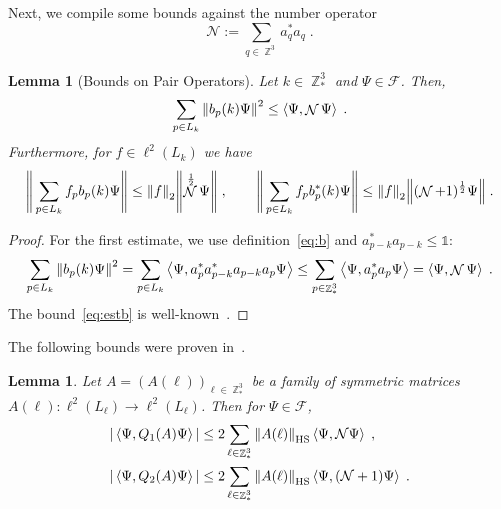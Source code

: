 \documentclass[12pt,a4paper]{article}
\numberwithin{equation}{section}
\newcommand{\cF}{\mathcal{F}}
\newcommand{\cN}{\mathcal{N}}
\newcommand{\1}{\mathbb{I}}
\newcommand{\HS}{\mathrm{HS}}
\DeclareMathOperator{\Z}{\mathbb{Z}}
\DeclareMathOperator{\NN}{\mathcal{N}}
\newcommand{\half}{\frac{1}{2}}
\newcommand{\eva}[1]{\left\langle #1 \right\rangle}
\theoremstyle{plain}
\newtheorem{lemma}[theorem]{Lemma}
\theoremstyle{definition}
\theoremstyle{remark}
\theoremstyle{plain}
\theoremstyle{definition}
\theoremstyle{remark}
\begin{document}
Next, we compile some bounds against the number operator
\begin{equation} \label{eq:cN}
	\cN := \sum_{q \in \Z^3} a_q^* a_q \;.
\end{equation}
  
\begin{lemma}[Bounds on Pair Operators]\label{lem:pairest}
Let $k \in \Z^3_*$ and $ \Psi \in \cF $. Then,
\begin{equation}\label{eq:estopb}
	\sum\limits_{p \in L_k}\norm{b_p(k)\Psi}^2 \leq  \eva{\Psi, \NN\Psi} \;.
\end{equation}
Furthermore, for $f \in \ell^2(L_k)$ we have
\begin{equation} \label{eq:estb}
	\Bigg\Vert \sum\limits_{p\in L_k}f_p b_p(k) \Psi \Bigg\Vert
	\leq \norm{f}_2 \norm{\NN^\half\Psi} \;, \qquad
	\Bigg\Vert \sum\limits_{p\in L_k}f_p b^*_p(k) \Psi \Bigg\Vert
	\leq \norm{f}_2 \norm{(\NN+1)^\half\Psi} \;.
\end{equation}
\end{lemma}
\begin{proof}
For the first estimate, we use definition~\eqref{eq:b} and $a^*_{p-k}a_{p-k} \leq \mathds{1}$:
\begin{equation}
	\sum\limits_{p \in L_k}\norm{b_p(k)\Psi}^2
	= \sum\limits_{p \in L_k} \eva{\Psi,a^*_{p} a^*_{p-k}a_{p-k} a_{p}\Psi}
	\leq \sum\limits_{p \in \Z^3_*} \eva{\Psi, a^*_{p} a_{p}\Psi}
	= \eva{\Psi, \NN \Psi} \;.  
\end{equation}
The bound~\eqref{eq:estb} is well-known~\cite[Prop.~4.2]{CHN21}.
\end{proof}

The following bounds were proven in~\cite[Props.~4.5~and~4.7]{CHN21}.

\begin{lemma}\label{lem:estQ2}
Let $A = (A(\ell))_{\ell \in \Z^3_*}$ be a family of symmetric matrices $ A(\ell) : \ell^2(L_\ell) \to \ell^2(L_\ell) $. Then for $ \Psi \in \cF $,
\begin{equation} \label{eq:Qest}
\begin{aligned}
	|\eva{\Psi,Q_1(A)\Psi}|
	&\leq 2\sum\limits_{\ell\in \Z^3_*}\norm{A(\ell)}_{\HS}\eva{\Psi,\mathcal{N} \Psi} \;, \\
	|\eva{\Psi,Q_2(A)\Psi}|
	&\leq 2\sum\limits_{\ell\in \Z^3_*}\norm{A(\ell)}_{\HS}\eva{\Psi,(\mathcal{N}+1) \Psi} \;.
\end{aligned}
\end{equation}
\end{lemma}
\end{document}
